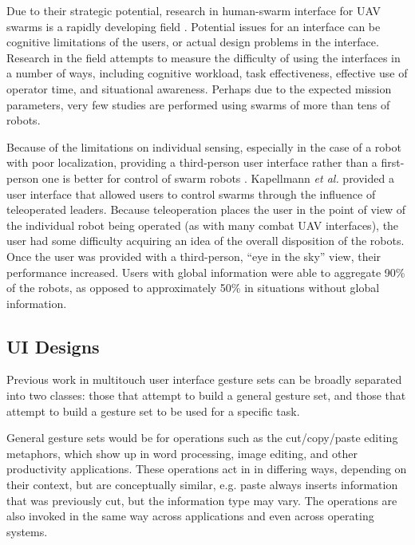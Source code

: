 Due to their strategic potential, research in human-swarm interface for UAV swarms is a rapidly developing field \citep{hocraffer2017meta}. 
Potential issues for an interface can be cognitive limitations of the users, or actual design problems in the interface. 
Research in the field attempts to measure the difficulty of using the interfaces in a number of ways, including cognitive workload, task effectiveness, effective use of operator time, and situational awareness. 
Perhaps due to the expected mission parameters, very few studies are performed using swarms of more than tens of robots. 

Because of the limitations on individual sensing, especially in the case of a robot with poor localization, providing a third-person user interface rather than a first-person one is better for control of swarm robots \citep{kapellmann2016human}. 
Kapellmann \emph{et al.} provided a user interface that allowed users to control swarms through the influence of teleoperated leaders. 
Because teleoperation places the user in the point of view of the individual robot being operated (as with many combat UAV interfaces), the user had some difficulty acquiring an idea of the overall disposition of the robots. 
Once the user was provided with a third-person, ``eye in the sky'' view, their performance increased. 
Users with global information were able to aggregate 90\% of the robots, as opposed to approximately 50\% in situations without global information. 

\subsection{UI Designs}
Previous work in multitouch user interface gesture sets can be broadly separated into two classes: those that attempt to build a general gesture set, and those that attempt to build a gesture set to be used for a specific task. 

General gesture sets would be for operations such as the cut/copy/paste editing metaphors, which show up in word processing, image editing, and other productivity applications. 
These operations act in in differing ways, depending on their context, but are conceptually similar, e.g. paste always inserts information that was previously cut, but the information type may vary. The operations are also invoked in the same way across applications and even across operating systems. 

